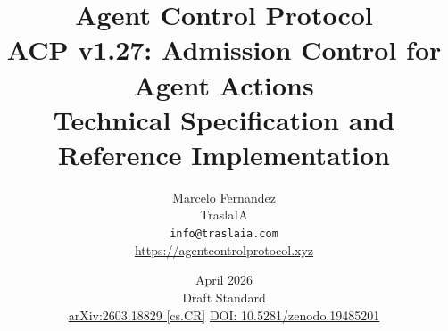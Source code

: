 \documentclass[11pt]{article}
\theoremstyle{definition}
\begin{document}

\title{%
  \textbf{Agent Control Protocol}\\[0.4em]
  \large ACP v1.27: Admission Control for Agent Actions\\[0.3em]
  \normalsize Technical Specification and Reference Implementation%
}

\author{
  Marcelo Fernandez\\
  TraslaIA\\
  \texttt{info@traslaia.com}\\
  \url{https://agentcontrolprotocol.xyz}
}

\date{April 2026 \\ \small Draft Standard \\ \small \href{https://arxiv.org/abs/2603.18829}{arXiv:2603.18829 [cs.CR]} \quad \href{https://doi.org/10.5281/zenodo.19485201}{DOI: 10.5281/zenodo.19485201}}

\maketitle
\end{document}
